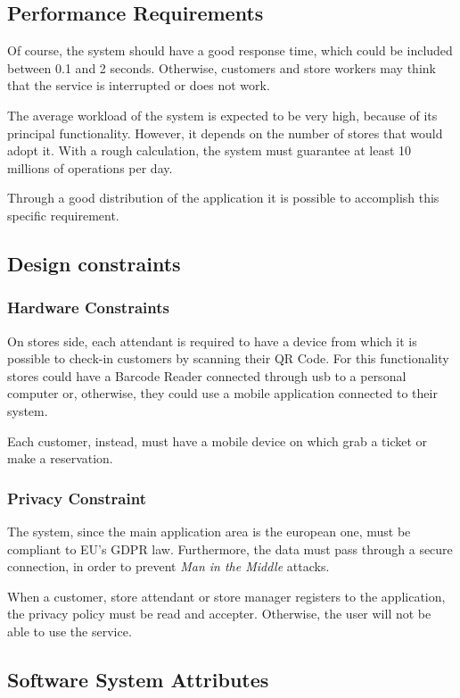 \documentclass[table, 12pt]{article}
\begin{document}
\begin{flushleft}
    \subsection{Performance Requirements}
    Of course, the system should have a good response time, which could be included between 0.1 and 2 seconds.
    Otherwise, customers and store workers may think that the service is interrupted or does not work.

    The average workload of the system is expected to be very high, because of its principal functionality. However, it depends on the number of stores that would adopt it.
    With a rough calculation, the system must guarantee at least 10 millions of operations per day.

    Through a good distribution of the application it is possible to accomplish this specific requirement.

    \subsection{Design constraints}
    \subsubsection{Hardware Constraints}
    On stores side, each attendant is required to have a device from which it is possible to check-in customers by scanning their QR Code.
    For this functionality stores could have a Barcode Reader connected through usb to a personal computer or, otherwise, they could use a mobile application connected to their system.

    Each customer, instead, must have a mobile device on which grab a ticket or make a reservation.

    \subsubsection{Privacy Constraint}
    The system, since the main application area is the european one, must be compliant to EU's GDPR law. Furthermore, the data must pass through a secure connection, in order to prevent \textit{Man in the Middle} attacks.

    When a customer, store attendant or store manager registers to the application, the privacy policy must be read and accepter. Otherwise, the user will not be able to use the service.

    \subsection{Software System Attributes}

\end{flushleft}
\end{document}
